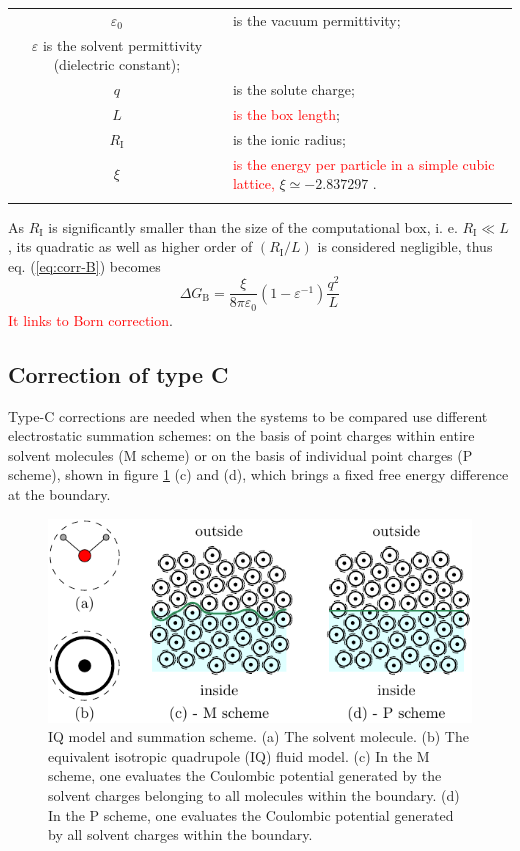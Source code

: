 \begin{tabular}{cl}
 $\varepsilon_{0}$ & is the vacuum permittivity;\tabularnewline
$\varepsilon$ is the solvent permittivity (dielectric constant);\tabularnewline
$q$ & is the solute charge;\tabularnewline
$L$ & \textcolor{red}{is the box length};\tabularnewline
$R_{\mathrm{I}}$ & is the ionic radius;\tabularnewline
$\xi$ & \textcolor{red}{is the energy per particle in a simple cubic lattice,}
$\xi\simeq-2.837297$ \citep{nijboer}.\tabularnewline
 & \tabularnewline
\end{tabular} 

As $R_{\mathrm{I}}$ is significantly smaller than the size of the
computational box, i. e. $R_{\mathrm{I}}\ll L$, its quadratic as
well as higher order of $\left(R_{\mathrm{I}}/L\right)$ is considered
negligible, thus eq. (\ref{eq:corr-B}) becomes
\begin{equation}
\Delta G_{\mathrm{B}}=\frac{\xi}{8\pi\varepsilon_{0}}\left(1-\varepsilon^{-1}\right)\frac{q^{2}}{L}
\end{equation}
\textcolor{red}{It links to Born correction}.


\subsection{Correction of type C}

Type-C corrections are needed when the systems to be compared use different
electrostatic summation schemes: on the basis of point charges within
entire solvent molecules (M scheme) or on the basis of individual
point charges (P scheme), shown in figure \ref{fig:IQ-model-som-scheme}
(c) and (d), which brings a fixed free energy difference at the boundary.

\begin{figure}[h]
\begin{centering}
\includegraphics{_figure/ion_correction}
\par\end{centering}

\caption [IQ model and summation scheme]{IQ model and summation scheme. (a) The solvent molecule. (b) The
equivalent isotropic quadrupole (IQ) fluid model. (c) In the M scheme,
one evaluates the Coulombic potential generated by the solvent charges
belonging to all molecules within the boundary. (d) In the P scheme,
one evaluates the Coulombic potential generated by all solvent charges
within the boundary.\label{fig:IQ-model-som-scheme}}
\end{figure}


